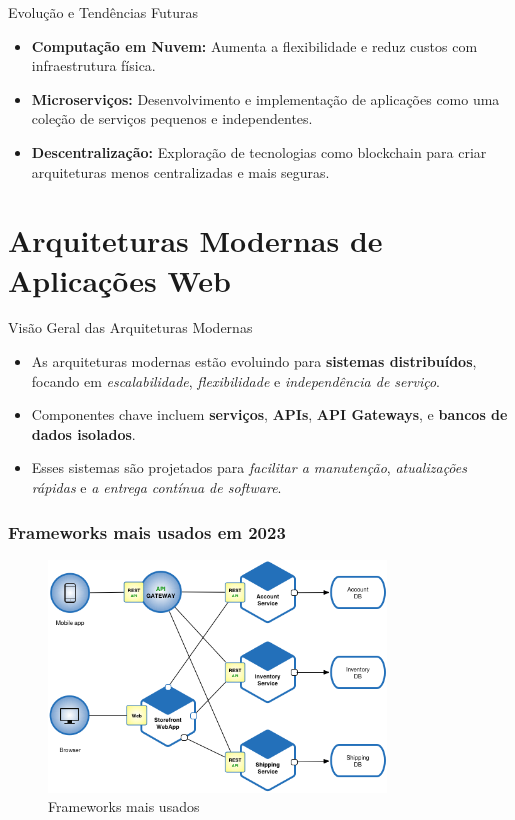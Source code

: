 \begin{frame}{Evolução e Tendências Futuras}
  \begin{itemize}
    \item \textbf{Computação em Nuvem:} Aumenta a flexibilidade e reduz custos com infraestrutura física.
    \item \textbf{Microserviços:} Desenvolvimento e implementação de aplicações como uma coleção de serviços pequenos e independentes.
    \item \textbf{Descentralização:} Exploração de tecnologias como blockchain para criar arquiteturas menos centralizadas e mais seguras.
  \end{itemize}
\end{frame}

\section{Arquiteturas Modernas de Aplicações Web}

\begin{frame}{Visão Geral das Arquiteturas Modernas}
  \begin{itemize}
    \item As arquiteturas modernas estão evoluindo para \textbf{sistemas distribuídos}, focando em \textit{escalabilidade}, \textit{flexibilidade} e \textit{independência de serviço}.
    \item Componentes chave incluem \textbf{serviços}, \textbf{APIs}, \textbf{API Gateways}, e \textbf{bancos de dados isolados}.
    \item Esses sistemas são projetados para \textit{facilitar a manutenção}, \textit{atualizações rápidas} e \textit{a entrega contínua de software}.
  \end{itemize}
\end{frame}

\begin{frame}[fragile]
  \frametitle{Frameworks mais usados em 2023}
  \begin{figure}
    \centering
    \includegraphics[width=0.8\textwidth]{assets/architecture.png}
    \caption{Frameworks mais usados}
  \end{figure}
\end{frame}

